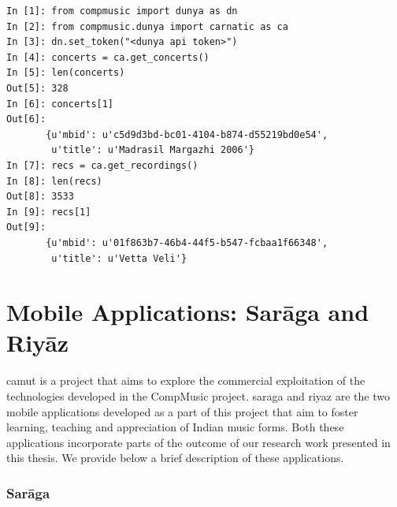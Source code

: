 \begin{verbatim}
In [1]: from compmusic import dunya as dn
In [2]: from compmusic.dunya import carnatic as ca
In [3]: dn.set_token("<dunya api token>")
In [4]: concerts = ca.get_concerts()
In [5]: len(concerts)
Out[5]: 328
In [6]: concerts[1]
Out[6]: 
       {u'mbid': u'c5d9d3bd-bc01-4104-b874-d55219bd0e54',
        u'title': u'Madrasil Margazhi 2006'}
In [7]: recs = ca.get_recordings()
In [8]: len(recs)
Out[8]: 3533
In [9]: recs[1]
Out[9]: 
       {u'mbid': u'01f863b7-46b4-44f5-b547-fcbaa1f66348',
        u'title': u'Vetta Veli'}        
\end{verbatim}

%
%



\section{Mobile Applications: Sar\={a}ga and Riy\={a}z}
\label{sec:mobile_apps_camut}

\gls{camut} is a project that aims to explore the commercial exploitation of the technologies developed in the CompMusic project. \gls{saraga} and \gls{riyaz} are the two mobile applications developed as a part of this project that aim to foster learning, teaching and appreciation of Indian music forms. Both these applications incorporate parts of the outcome of our research work presented in this thesis. We provide below a brief description of these applications. 

\subsubsection{Sar\={a}ga}
\label{sec:saraga}

